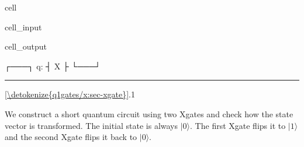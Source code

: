 \documentclass[letterpaper,10pt,english]{jupyterBook}
\begin{document}
\begin{sphinxuseclass}{cell}\begin{sphinxVerbatimInput}

\begin{sphinxuseclass}{cell_input}
\begin{sphinxVerbatim}[commandchars=\\\{\}]
   
\end{sphinxVerbatim}

\end{sphinxuseclass}\end{sphinxVerbatimInput}
\begin{sphinxVerbatimOutput}

\begin{sphinxuseclass}{cell_output}
\begin{sphinxVerbatim}[commandchars=\\\{\}]
   ┌───┐
q: ┤ X ├
   └───┘
\end{sphinxVerbatim}

\end{sphinxuseclass}\end{sphinxVerbatimOutput}

\end{sphinxuseclass}

\bigskip\hrule\bigskip


\sphinxAtStartPar
{} \hyperref[\detokenize{q1gates/x:sec-xgate}]{\ref{\detokenize{q1gates/x:sec-xgate}}}.1

\sphinxAtStartPar
We construct a short quantum circuit using two Xgates and check how the state vector is transformed.  The initial state is always \(|0\rangle\).  The first Xgate flips it to \(|1\rangle\) and the second Xgate flips it back to \(|0\rangle\).
\end{document}
